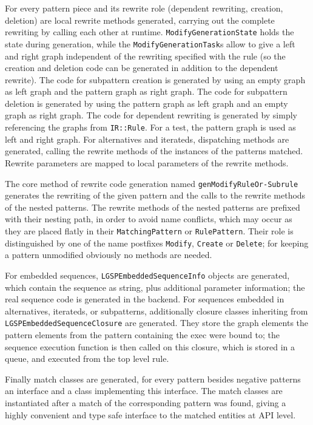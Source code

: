 For every pattern piece and its rewrite role (dependent rewriting, creation, deletion) are local rewrite methods generated, carrying out the complete rewriting by calling each other at runtime.
\texttt{Modify\-Generation\-State} holds the state during generation, while the \texttt{Modify\-Generation\-Task}s allow to give a left and right graph independent of the rewriting specified with the rule (so the creation and deletion code can be generated in addition to the dependent rewrite).
The code for subpattern creation is generated by using an empty graph as left graph and the pattern graph as right graph.
The code for subpattern deletion is generated by using the pattern graph as left graph and an empty graph as right graph.
The code for dependent rewriting is generated by simply referencing the graphs from \texttt{IR::Rule}.
For a test, the pattern graph is used as left and right graph.
For alternatives and iterateds, dispatching methods are generated, calling the rewrite methods of the instances of the patterns matched.
Rewrite parameters are mapped to local parameters of the rewrite methods.

The core method of rewrite code generation named \texttt{gen\-Modify\-Rule\-Or-Subrule} generates the rewriting of the given pattern and the calls to the rewrite methods of the nested patterns.
The rewrite methods of the nested patterns are prefixed with their nesting path, in order to avoid name conflicts, which may occur as they are placed flatly in their \texttt{Matching\-Pattern} or \texttt{Rule\-Pattern}.
Their role is distinguished by one of the name postfixes \texttt{Modify}, \texttt{Create} or \texttt{Delete}; for keeping a pattern unmodified obviously no methods are needed.

For embedded sequences, \texttt{LGSPEmbeddedSequenceInfo} objects are generated, which contain the sequence as string, plus additional parameter information; the real sequence code is generated in the backend.
For sequences embedded in alternatives, iterateds, or subpatterns, additionally closure classes inheriting from \texttt{LGSPEmbeddedSequenceClosure} are generated.
They store the graph elements the pattern elements from the pattern containing the exec were bound to; the sequence execution function is then called on this closure, which is stored in a queue, and executed from the top level rule.

Finally match classes are generated, for every pattern besides negative patterns an interface and a class implementing this interface.
The match classes are instantiated after a match of the corresponding pattern was found, giving a highly convenient and type safe interface to the matched entities at API level.



